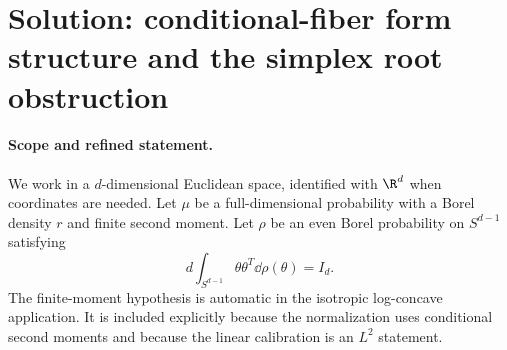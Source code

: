 \documentclass[../main.tex]{subfiles}
\begin{document}
%
\section*{Solution: conditional-fiber form structure and the simplex root obstruction}
\label{sec:sol-conditional-fiber-frame-structure}

\paragraph{Scope and refined statement.}
We work in a $d$-dimensional Euclidean space, identified with $\R^d$ when coordinates are
needed.  Let $\mu$ be a full-dimensional probability with a Borel density $r$ and finite second
moment.  Let $\rho$ be an even Borel probability on $S^{d-1}$ satisfying
\begin{equation}
  d\int_{S^{d-1}}\theta\theta^T\dd\rho(\theta)=I_d.
  \label{eq:sol-fiber-tight-frame}
\end{equation}
The finite-moment hypothesis is automatic in the isotropic log-concave application.  It is
included explicitly because the normalization uses conditional second moments and because the
linear calibration is an $L^2$ statement.
\end{document}
